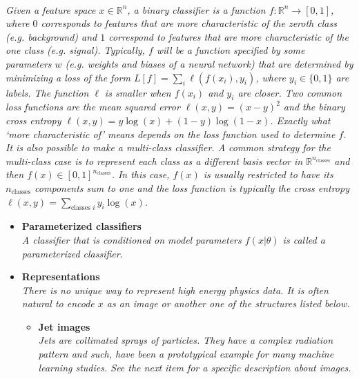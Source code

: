 \documentclass[12pt,letterpaper]{article}
\begin{document}
\begin{itemize}
\\\textit{Given a feature space $x\in\mathbb{R}^n$, a binary classifier is a function $f:\mathbb{R}^n\rightarrow [0,1]$, where $0$ corresponds to features that are more characteristic of the zeroth class (e.g. background) and $1$ correspond to features that are more characteristic of the one class (e.g. signal).  Typically, $f$ will be a function specified by some parameters $w$ (e.g. weights and biases of a neural network) that are determined by minimizing a loss of the form $L[f]=\sum_{i}\ell(f(x_i),y_i)$, where $y_i\in\{0,1\}$ are labels.  The function $\ell$ is smaller when $f(x_i)$ and $y_i$ are closer.  Two common loss functions are the mean squared error $\ell(x,y)=(x-y)^2$ and the binary cross entropy $\ell(x,y)=y\log(x)+(1-y)\log(1-x)$.  Exactly what `more characteristic of' means depends on the loss function used to determine $f$.  It is also possible to make a multi-class classifier.  A common strategy for the multi-class case is to represent each class as a different basis vector in $\mathbb{R}^{n_\text{classes}}$ and then $f(x)\in[0,1]^{n_\text{classes}}$.  In this case, $f(x)$ is usually restricted to have its $n_\text{classes}$ components sum to one and the loss function is typically the cross entropy $\ell(x,y)=\sum_\text{classes $i$} y_i\log(x)$.}
	\begin{itemize}
		\item \textbf{Parameterized classifiers}~\cite{Aguilar-Saavedra:2025zgs,Chen:2023ind,Nachman:2021yvi,Cranmer:2015bka,Baldi:2016fzo}
		\\\textit{A classifier that is conditioned on model parameters $f(x|\theta)$ is called a parameterized classifier.}
		\item \textbf{Representations}
			\\\textit{There is no unique way to represent high energy physics data.  It is often natural to encode $x$ as an image or another one of the structures listed below.}
			\begin{itemize}
				\item \textbf{Jet images}~\cite{Bassa:2025qru,Qureshi:2025ylv,Kheddar:2024osf,Han:2023djl,Choi:2023slq,Filipek:2021qbe,Du:2020pmp,collado2021learning,Lee:2019cad,li2020attention,li2020reconstructing,Macaluso:2018tck,Kasieczka:2017nvn,Komiske:2016rsd,Barnard:2016qma,Komiske:2018oaa,Lin:2018cin,ATL-PHYS-PUB-2017-017,deOliveira:2015xxd,Almeida:2015jua,Cogan:2014oua,Pumplin:1991kc}
				\\\textit{Jets are collimated sprays of particles.  They have a complex radiation pattern and such, have been a prototypical example for many machine learning studies.  See the next item for a specific description about images.}

\end{itemize}
\end{itemize}
\end{itemize}
\end{document}

